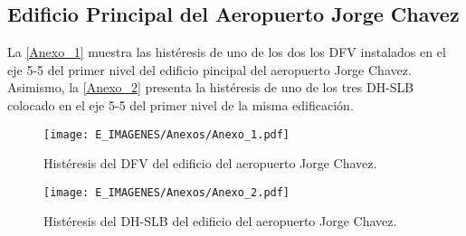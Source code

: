 \subsection*{Edificio Principal del Aeropuerto Jorge Chavez}
{}

La \autoref{Anexo_1} muestra las histéresis de uno de los dos los DFV instalados en el eje 5-5 del primer nivel del edificio pincipal del aeropuerto Jorge Chavez. Asimismo, la \autoref{Anexo_2} presenta la histéresis de uno de los tres DH-SLB colocado en el eje 5-5 del primer nivel de la misma edificación.


\begin{figure}[!h]
	\centering
	\texttt{[image: E\_IMAGENES/Anexos/Anexo\_1.pdf]}
	\vspace{-8 mm}
	\caption[]{\centering\footnotesize Histéresis del DFV del edificio del aeropuerto Jorge Chavez.}
	\label{Anexo_1}
\end{figure}


\begin{figure}[!h]
	\centering
	\texttt{[image: E\_IMAGENES/Anexos/Anexo\_2.pdf]}
	\vspace{-8 mm}
	\caption[]{\centering\footnotesize Histéresis del DH-SLB del edificio del aeropuerto Jorge Chavez.}
	\label{Anexo_2}
\end{figure}
